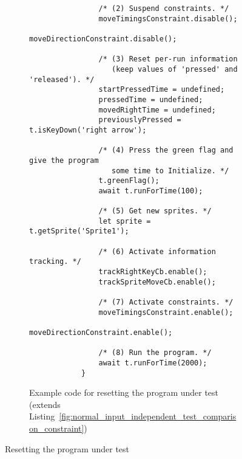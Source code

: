 \begin{figure}[htpb]
\begin{subfigure}[m]{.55\textwidth}
\begin{verbatim}
                /* (2) Suspend constraints. */
                moveTimingsConstraint.disable();
                moveDirectionConstraint.disable();

                /* (3) Reset per-run information
                   (keep values of 'pressed' and 'released'). */
                startPressedTime = undefined;
                pressedTime = undefined;
                movedRightTime = undefined;
                previouslyPressed = t.isKeyDown('right arrow');

                /* (4) Press the green flag and give the program
                   some time to Initialize. */
                t.greenFlag();
                await t.runForTime(100);

                /* (5) Get new sprites. */
                let sprite = t.getSprite('Sprite1');

                /* (6) Activate information tracking. */
                trackRightKeyCb.enable();
                trackSpriteMoveCb.enable();

                /* (7) Activate constraints. */
                moveTimingsConstraint.enable();
                moveDirectionConstraint.enable();

                /* (8) Run the program. */
                await t.runForTime(2000);
            }
        \end{verbatim}
        \vspace{-\bigskipamount}
        \caption{Example code for resetting the program under test (extends Listing~\ref{fig:normal_input_independent_test_comparison_constraint})}
        \label{fig:resetting_the_program_under_test_example}
    \end{subfigure}

    \caption{Resetting the program under test}
    \label{fig:resetting_the_program_under_test}
\end{figure}


%
%
%
%
%
%


